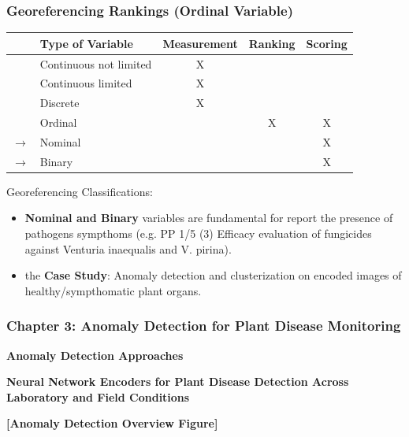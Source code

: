 \documentclass[aspectratio=43]{beamer}
\begin{document}
\begin{frame}
    \frametitle{Georeferencing Rankings (Ordinal Variable)}
    \begin{table}[ht]
        \centering
        \begin{tabular}{|c|l|c|c|c|}
        \hline
        & \textbf{Type of Variable} & \textbf{Measurement} & \textbf{Ranking} & \textbf{Scoring} \\
        \hline
        \rowcolor{green!20} & Continuous not limited & X & & \\
        \hline
        \rowcolor{green!20} & Continuous limited & X & & \\
        \hline
        \rowcolor{yellow!20} & Discrete & X & & \\
        \hline
        \rowcolor{red!20} & Ordinal & & X & X \\
        \hline
        \rowcolor{red!20} $\rightarrow$ & Nominal & & & X \\
        \hline
        \rowcolor{red!20} $\rightarrow$ & Binary & & & X \\
        \hline
        \end{tabular}
    \end{table}
    \begin{block}{Georeferencing Classifications:}
        \small
        \begin{itemize}
            \item \textbf{Nominal and Binary} variables are fundamental for report the presence of pathogens sympthoms (e.g. PP 1/5 (3) Efficacy evaluation of fungicides against Venturia inaequalis and V. pirina).
            \item the \textbf{Case Study}: Anomaly detection and clusterization on encoded images of healthy/sympthomatic plant organs. 
            \end{itemize}
    \end{block}
\end{frame}



\begin{frame}
    \frametitle{Chapter 3: Anomaly Detection for Plant Disease Monitoring}
    
    \begin{center}
        \Huge \textbf{Anomaly Detection Approaches}
        \vspace{0.5cm}
        
        \Large \textbf{Neural Network Encoders for Plant Disease Detection Across Laboratory and Field Conditions}
        
        \vspace{1cm}
        \begin{center}
            \textbf{[Anomaly Detection Overview Figure]}
        \end{center}
    \end{center}
\end{frame}
\end{document}
